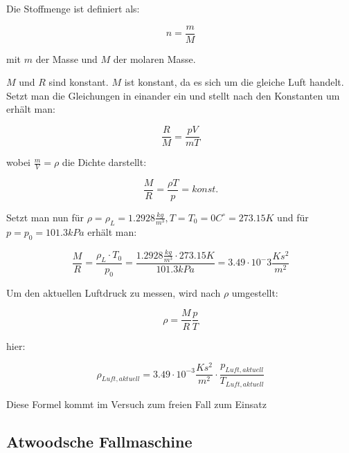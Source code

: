 \documentclass{protokoll}
\begin{document}
Die Stoffmenge ist definiert als:

\begin{equation}
 n = \frac{m}{M} 
\end{equation}



mit $m$ der Masse und $M$ der molaren Masse.

$M$ und $R$ sind konstant. $M$ ist konstant, da es sich 
um die gleiche Luft handelt. Setzt man die Gleichungen 
in einander ein und stellt nach den Konstanten um erhält man:

\begin{equation}
 \frac{R}{M} = \frac{pV}{mT} 
\end{equation}



wobei $\frac{m}{V} = \rho$ die Dichte darstellt:


\begin{equation}
 \frac{M}{R} = \frac{\rho T}{p} = konst.
\end{equation}




Setzt man nun für $ \rho = \rho_L = 1.2928 \frac{kg}{m^3}, 
T = T_0 = 0 C^\circ = 273.15 K $ und für $ p = p_0 = 101.3 kPa $
erhält man:

\begin{equation}
\frac{M}{R} = \frac{\rho_L\cdot T_0}{p_0} = \frac{1.2928 \frac{kg}{m^3}\cdot 273.15 K}{101.3 kPa}
= 3.49\cdot 10^-3 \frac{Ks^2}{m^2} 
\end{equation}



Um den aktuellen Luftdruck zu messen, wird nach $\rho$ umgestellt:

\begin{equation}
 \rho = \frac{M}{R} \frac{p}{T} 
\end{equation}



hier:

\begin{equation}
 \rho_{Luft, aktuell} = 3.49\cdot 10^{-3} \frac{Ks^2}{m^2}\cdot 
\frac{p_{Luft, aktuell}}{T_{Luft, aktuell}} 
\end{equation}



Diese Formel kommt im Versuch zum freien Fall zum Einsatz




\subsection{Atwoodsche Fallmaschine}
\end{document}
